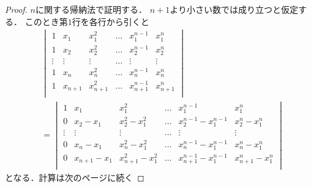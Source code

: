 \documentclass[leqno, a4paper, 12pt]{jsarticle}
\begin{document}
\begin{proof}
$n$に関する帰納法で証明する．
$n+1$より小さい数では成り立つと仮定する．
このとき第$1$行を各行から引くと
\begin{align*}
&
\begin{vmatrix}
1 & x_{1} & x_{1}^{2} & \dots & x_{1}^{n-1} & x_{1}^{n}\\
1 & x_{2} & x_{2}^{2} & \dots & x_{2}^{n-1} & x_{2}^{n}\\
\vdots & \vdots  &  \vdots & \dots &\vdots & \vdots\\
1 & x_{n} & x_{n}^{2} & \dots & x_{n}^{n-1} & x_{n}^{n}\\
1 & x_{n+1} & x_{n+1}^{2} & \dots & x_{n+1}^{n-1} & x_{n+1}^{n}\\
\end{vmatrix}
\\
&=
\begin{vmatrix}
1 & x_{1} & x_{1}^{2} & \dots & x_{1}^{n-1} & x_{1}^{n}\\
0 & x_{2}-x_{1} & x_{2}^{2}-x_{1}^{2} & \dots & x_{2}^{n-1}-x_{1}^{n-1} & x_{2}^{n}-x_{1}^{n}\\
\vdots & \vdots  &  \vdots & \dots &\vdots & \vdots\\
0 & x_{n}-x_{1} & x_{n}^{2} -x_{1}^{2}& \dots & x_{n}^{n-1}-x_{1}^{n-1} & x_{n}^{n}-x_{1}^{n}\\
0 & x_{n+1} -x_{1}& x_{n+1}^{2}-x_{1}^{2} & \dots & x_{n+1}^{n-1} -x_{1}^{n-1}& x_{n+1}^{n}-x_{1}^{n}\\
\end{vmatrix}
\end{align*}
となる．計算は次のページに続く


\end{proof}
\end{document}
